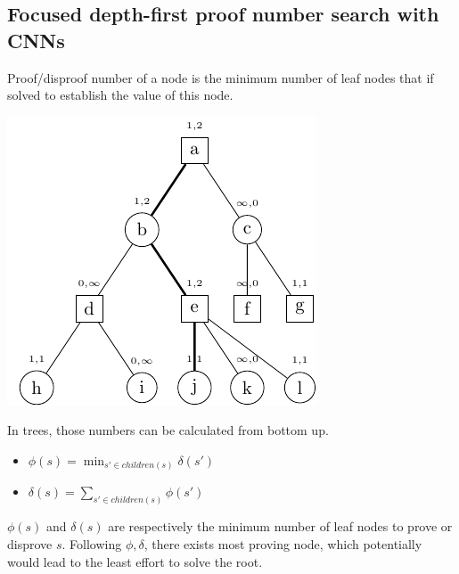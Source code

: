 \documentclass[a0,portrait]{a0poster}
\begin{document}
\begin{multicols}{3}
\color{Black} %

\section*{Focused depth-first proof number search with CNNs}

Proof/disproof number of a node is the minimum number of leaf nodes that if solved to establish the value of this node. 
\begin{minipage}{0.5\linewidth}
\includegraphics[width=\textwidth]{pns_example.pdf} \\
\end{minipage}
\begin{minipage}{0.4\linewidth}

In trees, those numbers can be calculated from bottom up. 
\begin{itemize}
\item $\phi(s) = \min_{s' \in children(s)} \delta(s')$
\item $\delta(s) = \sum_{s' \in children(s)} \phi(s')$
\end{itemize}
\end{minipage}

$\phi(s)$ and $\delta(s)$ are respectively the minimum number of leaf nodes to prove or disprove $s$. 
Following $\phi, \delta$, there exists most proving node, which potentially would lead to the least effort to solve the root.


\end{multicols}
\end{document}
